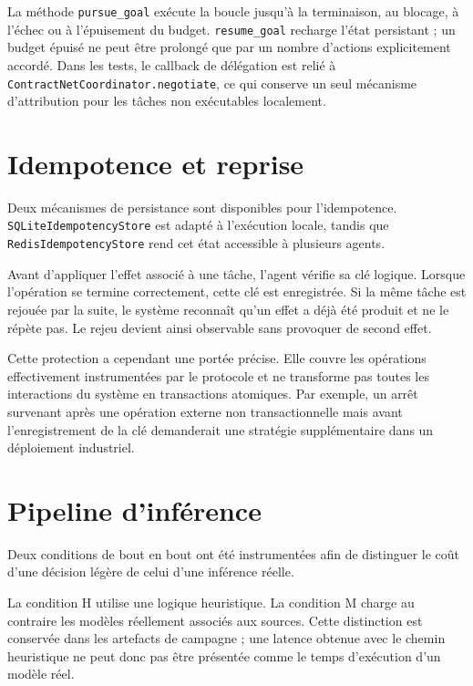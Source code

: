 La méthode \texttt{pursue\_goal} exécute la boucle jusqu'à la terminaison, au blocage, à l'échec ou à l'épuisement du budget. \texttt{resume\_goal} recharge l'état persistant ; un budget épuisé ne peut être prolongé que par un nombre d'actions explicitement accordé. Dans les tests, le callback de délégation est relié à \texttt{ContractNetCoordinator.negotiate}, ce qui conserve un seul mécanisme d'attribution pour les tâches non exécutables localement.



\section{Idempotence et reprise}

Deux mécanismes de persistance sont disponibles pour l'idempotence. \texttt{SQLiteIdempotencyStore} est adapté à l'exécution locale, tandis que \texttt{RedisIdempotencyStore} rend cet état accessible à plusieurs agents.

Avant d'appliquer l'effet associé à une tâche, l'agent vérifie sa clé logique. Lorsque l'opération se termine correctement, cette clé est enregistrée. Si la même tâche est rejouée par la suite, le système reconnaît qu'un effet a déjà été produit et ne le répète pas. Le rejeu devient ainsi observable sans provoquer de second effet.

Cette protection a cependant une portée précise. Elle couvre les opérations effectivement instrumentées par le protocole et ne transforme pas toutes les interactions du système en transactions atomiques. Par exemple, un arrêt survenant après une opération externe non transactionnelle mais avant l'enregistrement de la clé demanderait une stratégie supplémentaire dans un déploiement industriel.


\section{Pipeline d'inférence}
\label{sec:inference-e2e}

Deux conditions de bout en bout ont été instrumentées afin de distinguer le coût d'une décision légère de celui d'une inférence réelle.

La condition H utilise une logique heuristique. La condition M charge au contraire les modèles réellement associés aux sources. Cette distinction est conservée dans les artefacts de campagne ; une latence obtenue avec le chemin heuristique ne peut donc pas être présentée comme le temps d'exécution d'un modèle réel.

